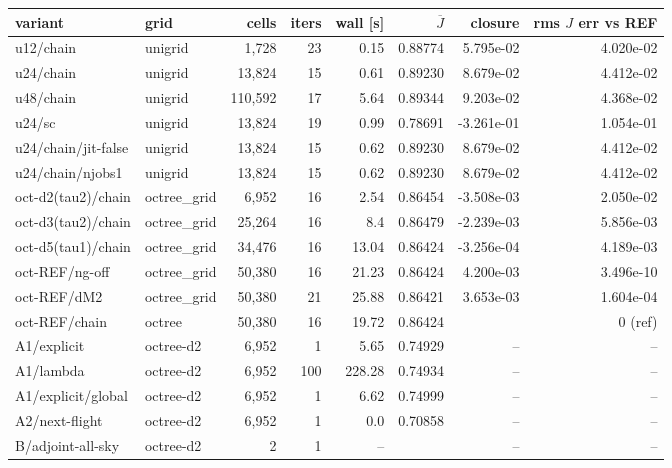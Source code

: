 \begin{tabular}{llrrrrrr}
\toprule
variant & grid & cells & iters & wall [s] & $\overline{J}$ &
closure & rms $J$ err vs REF \\
\midrule
u12/chain & unigrid & 1,728 & 23 & 0.15 & 0.88774 & 5.795e-02 & 4.020e-02 \\
u24/chain & unigrid & 13,824 & 15 & 0.61 & 0.89230 & 8.679e-02 & 4.412e-02 \\
u48/chain & unigrid & 110,592 & 17 & 5.64 & 0.89344 & 9.203e-02 & 4.368e-02 \\
u24/sc & unigrid & 13,824 & 19 & 0.99 & 0.78691 & -3.261e-01 & 1.054e-01 \\
u24/chain/jit-false & unigrid & 13,824 & 15 & 0.62 & 0.89230 & 8.679e-02 & 4.412e-02 \\
u24/chain/njobs1 & unigrid & 13,824 & 15 & 0.62 & 0.89230 & 8.679e-02 & 4.412e-02 \\
oct-d2(tau2)/chain & octree\_grid & 6,952 & 16 & 2.54 & 0.86454 & -3.508e-03 & 2.050e-02 \\
oct-d3(tau2)/chain & octree\_grid & 25,264 & 16 & 8.4 & 0.86479 & -2.239e-03 & 5.856e-03 \\
oct-d5(tau1)/chain & octree\_grid & 34,476 & 16 & 13.04 & 0.86424 & -3.256e-04 & 4.189e-03 \\
oct-REF/ng-off & octree\_grid & 50,380 & 16 & 21.23 & 0.86424 & 4.200e-03 & 3.496e-10 \\
oct-REF/dM2 & octree\_grid & 50,380 & 21 & 25.88 & 0.86421 & 3.653e-03 & 1.604e-04 \\
oct-REF/chain & octree & 50,380 & 16 & 19.72 & 0.86424 &  & 0 (ref) \\
A1/explicit & octree-d2 & 6,952 & 1 & 5.65 & 0.74929 & -- & -- \\
A1/lambda & octree-d2 & 6,952 & 100 & 228.28 & 0.74934 & -- & -- \\
A1/explicit/global & octree-d2 & 6,952 & 1 & 6.62 & 0.74999 & -- & -- \\
A2/next-flight & octree-d2 & 6,952 & 1 & 0.0 & 0.70858 & -- & -- \\
B/adjoint-all-sky & octree-d2 & 2 & 1 & -- &  & -- & -- \\
\bottomrule
\end{tabular}

